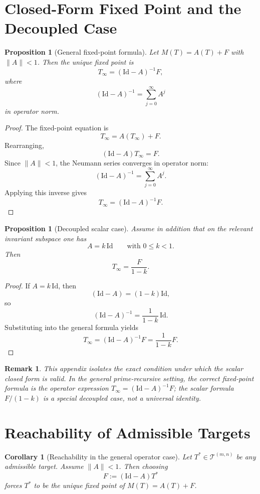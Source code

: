 \documentclass[11pt,a4paper]{article}
\newtheorem{corollary}[theorem]{Corollary}
\newtheorem{proposition}[theorem]{Proposition}
\newtheorem{remark}[theorem]{Remark}
\begin{document}
\section{Closed-Form Fixed Point and the Decoupled Case}

\begin{proposition}[General fixed-point formula]
Let \(M(T)=A(T)+F\) with \(\|A\|<1\). Then the unique fixed point is
\[
T_\infty = (\mathrm{Id}-A)^{-1}F,
\]
where
\[
(\mathrm{Id}-A)^{-1} = \sum_{j=0}^\infty A^j
\]
in operator norm.
\end{proposition}

\begin{proof}
The fixed-point equation is
\[
T_\infty = A(T_\infty)+F.
\]
Rearranging,
\[
(\mathrm{Id}-A)T_\infty = F.
\]
Since \(\|A\|<1\), the Neumann series converges in operator norm:
\[
(\mathrm{Id}-A)^{-1} = \sum_{j=0}^{\infty}A^j.
\]
Applying this inverse gives
\[
T_\infty = (\mathrm{Id}-A)^{-1}F.
\]
\end{proof}

\begin{proposition}[Decoupled scalar case]
Assume in addition that on the relevant invariant subspace one has
\[
A = k\,\mathrm{Id}
\qquad\text{with } 0\le k<1.
\]
Then
\[
T_\infty = \frac{F}{1-k}.
\]
\end{proposition}

\begin{proof}
If \(A=k\,\mathrm{Id}\), then
\[
(\mathrm{Id}-A) = (1-k)\mathrm{Id},
\]
so
\[
(\mathrm{Id}-A)^{-1} = \frac{1}{1-k}\,\mathrm{Id}.
\]
Substituting into the general formula yields
\[
T_\infty
=
(\mathrm{Id}-A)^{-1}F
=
\frac{1}{1-k}F.
\]
\end{proof}

\begin{remark}
This appendix isolates the exact condition under which the scalar closed form is valid. In the general prime-recursive setting, the correct fixed-point formula is the operator expression \(T_\infty=(\mathrm{Id}-A)^{-1}F\); the scalar formula \(F/(1-k)\) is a special decoupled case, not a universal identity.
\end{remark}

\section{Reachability of Admissible Targets}

\begin{corollary}[Reachability in the general operator case]
Let \(T^*\in \mathcal{T}^{(m,n)}\) be any admissible target. Assume \(\|A\|<1\). Then choosing
\[
F := (\mathrm{Id}-A)T^*
\]
forces \(T^*\) to be the unique fixed point of \(M(T)=A(T)+F\).
\end{corollary}
\end{document}
